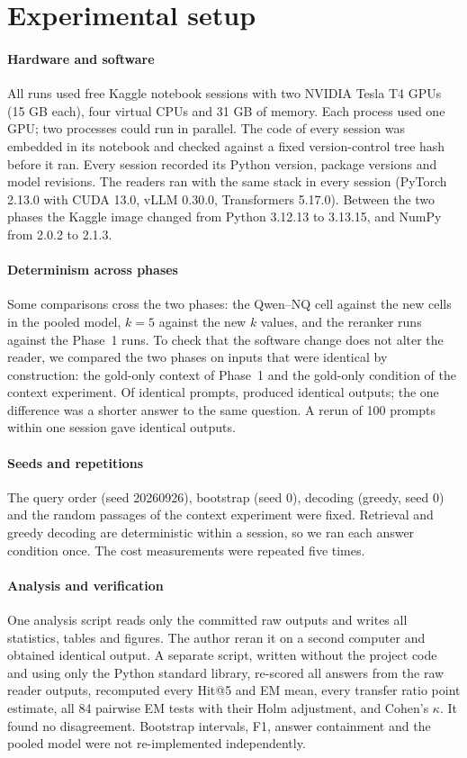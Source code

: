 \section{Experimental setup}\label{sec:setup}

\paragraph{Hardware and software}
All runs used free Kaggle notebook sessions with two NVIDIA Tesla T4 GPUs (15 GB each), four virtual CPUs and 31 GB of memory. Each process used one GPU; two processes could run in parallel. The code of every session was embedded in its notebook and checked against a fixed version-control tree hash before it ran. Every session recorded its Python version, package versions and model revisions. The readers ran with the same stack in every session (PyTorch 2.13.0 with CUDA 13.0, vLLM 0.30.0, Transformers 5.17.0). Between the two phases the Kaggle image changed from Python 3.12.13 to 3.13.15, and NumPy from 2.0.2 to 2.1.3.

\paragraph{Determinism across phases}
Some comparisons cross the two phases: the Qwen--NQ cell against the new cells in the pooled model, $k=5$ against the new $k$ values, and the reranker runs against the Phase~1 runs. To check that the software change does not alter the reader, we compared the two phases on inputs that were identical by construction: the gold-only context of Phase~1 and the gold-only condition of the context experiment. Of  identical prompts,  produced identical outputs; the one difference was a shorter answer to the same question. A rerun of 100 prompts within one session gave  identical outputs.

\paragraph{Seeds and repetitions}
The query order (seed 20260926), bootstrap (seed 0), decoding (greedy, seed 0) and the random passages of the context experiment were fixed. Retrieval and greedy decoding are deterministic within a session, so we ran each answer condition once. The cost measurements were repeated five times.

\paragraph{Analysis and verification}
One analysis script reads only the committed raw outputs and writes all statistics, tables and figures. The author reran it on a second computer and obtained identical output. A separate script, written without the project code and using only the Python standard library, re-scored all  answers from the raw reader outputs, recomputed every Hit@5 and EM mean, every transfer ratio point estimate, all 84 pairwise EM tests with their Holm adjustment, and Cohen's $\kappa$. It found no disagreement. Bootstrap intervals, F1, answer containment and the pooled model were not re-implemented independently.

